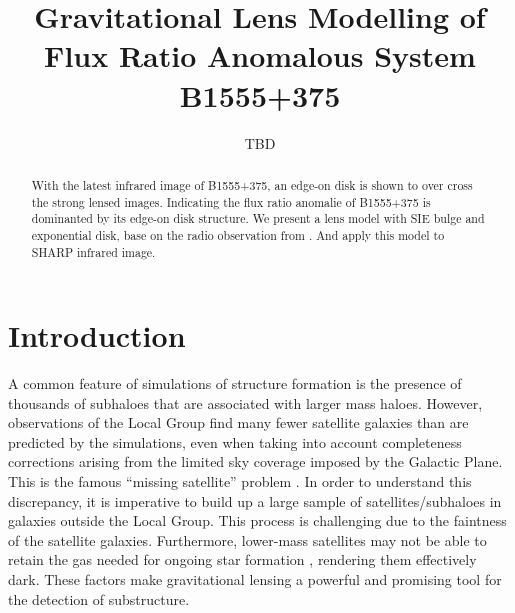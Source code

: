 \documentclass[manuscript]{emulateapj}
\newcommand{\simona}[1]{\textcolor{simonacolor}{#1}}
\begin{document}
\title{Gravitational Lens Modelling of Flux Ratio Anomalous System B1555+375}
\author{TBD}

\begin{abstract}
With the latest infrared image of B1555+375, an edge-on disk is shown to over cross the strong lensed images. Indicating the flux ratio anomalie of B1555+375 is dominanted by its edge-on disk structure. We present a lens model with SIE bulge and exponential disk, base on the radio observation from \citet{Marlow}. And apply this model to SHARP infrared image.

\end{abstract}


\section{Introduction}

A common feature of simulations of structure formation is the presence
of thousands of subhaloes that are associated with larger mass haloes.
However, observations of the Local Group find many fewer satellite
galaxies than are predicted by the simulations, even when taking into
account completeness corrections arising from the limited sky coverage
imposed by the Galactic Plane.  This is the famous ``missing
satellite'' problem \citep{Klypin1999, Moore1999, S07}. In order to understand
this discrepancy, it is imperative to build up a large sample of satellites/subhaloes in galaxies outside the Local Group.  
This process is challenging
due to the faintness of the satellite galaxies.  Furthermore, lower-mass
satellites may not be able to retain the gas needed for ongoing star
formation \citep[e.g.,][]{P11}, rendering them effectively dark.
These factors make gravitational \simona{lensing a powerful and promising tool for the detection of substructure.}
\end{document}
